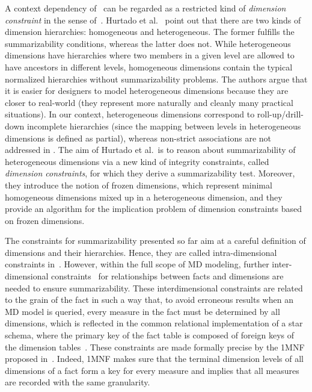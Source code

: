 A context dependency of~\cite{DBLP:journals/is/LechtenborgerV03} can
be regarded as a restricted kind of \emph{dimension constraint} in
the sense of~\cite{DBLP:journals/tods/HurtadoGM05}.  Hurtado et
al.~\cite{DBLP:journals/tods/HurtadoGM05} point out that there are
two kinds of dimension hierarchies: homogeneous and heterogeneous.
The former fulfills the summarizability conditions, whereas the
latter does not. While heterogeneous dimensions have hierarchies
where two members in a given level are allowed to have ancestors in
different levels, homogeneous dimensions contain the typical
normalized hierarchies without summarizability problems. The authors
argue that it is easier for designers to model heterogeneous
dimensions because they are closer to real-world (they represent
more naturally and cleanly many practical situations).  In our
context, heterogeneous dimensions correspond to roll-up/drill-down
incomplete hierarchies (since the mapping between levels in
heterogeneous dimensions is defined as partial), whereas non-strict
associations are not addressed in
\cite{DBLP:journals/tods/HurtadoGM05}.  The aim of Hurtado et al.\
is to reason about summarizability of heterogeneous dimensions via a
new kind of integrity constraints, called \emph{dimension
constraints}, for which they derive a summarizability test.
Moreover, they introduce the notion of frozen dimensions, which
represent minimal homogeneous dimensions mixed up in a heterogeneous
dimension, and they provide an algorithm for the implication problem
of dimension constraints based on frozen dimensions.

The constraints for summarizability presented so far aim at a
careful definition of dimensions and their hierarchies.  Hence, they
are called intra-dimensional constraints
in~\cite{DBLP:conf/ssdbm/LehnerAW98}.  However, within the full
scope of MD modeling, further inter-dimensional
constraints~\cite{DBLP:conf/ssdbm/LehnerAW98} for relationships
between facts and dimensions are needed to ensure summarizability.
These interdimensional constraints are related to the grain of the
fact in such a way that, to avoid erroneous results when an MD model
is queried, every measure in the fact must be determined by all
dimensions, which is reflected in the common relational
implementation of a star schema, where the primary key of the fact
table is composed of foreign keys of the dimension
tables~\cite{book/Kimball/DW}. These constraints are made formally
precise by the 1MNF proposed
in~\cite{DBLP:journals/is/LechtenborgerV03}. Indeed, 1MNF makes sure
that the terminal dimension levels of all dimensions of a fact form
a key for every measure and implies that all measures are recorded
with the same granularity.

